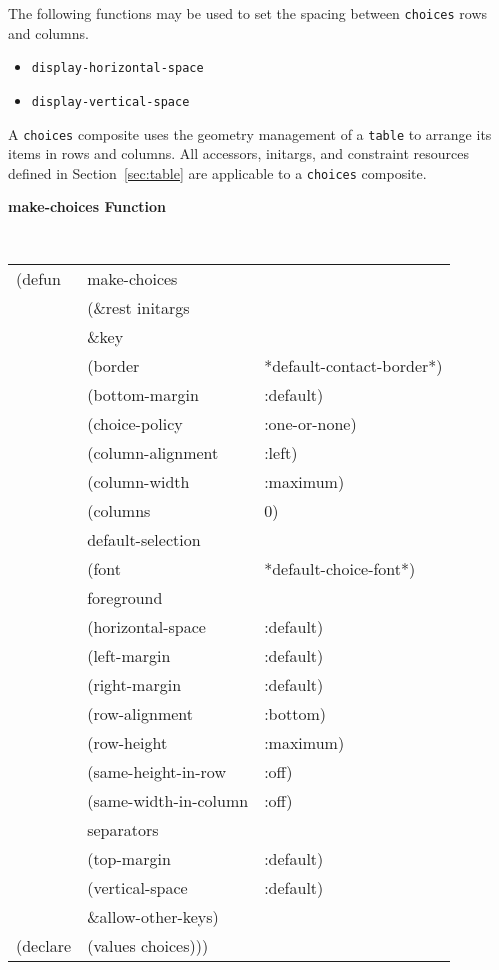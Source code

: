 \pagebreak
The following functions may be used to set the spacing between  {\tt choices} rows
and columns.

\begin{itemize}
\item {\tt display-horizontal-space}
\item {\tt display-vertical-space}
\end{itemize}




A {\tt choices} composite uses the
geometry management of a {\tt table} to arrange its items in rows and columns.
All accessors, initargs, and constraint resources defined in
Section~\ref{sec:table} are applicable to a {\tt choices} composite.


{\samepage
{\large {\bf make-choices \hfill Function}} 
\label{page:make-choices}
\begin{flushright} \parbox[t]{6.125in}{
\tt
\begin{tabular}{lll}
\raggedright
(defun & make-choices \\
       & (\&rest initargs \\
       & \&key  \\ 
       & (border                & *default-contact-border*) \\ 
       & (bottom-margin         & :default) \\
       & (choice-policy         & :one-or-none)\\
       & (column-alignment      & :left)\\
       & (column-width          & :maximum)\\
       & (columns               & 0)\\
       & default-selection & \\
       & (font                  & *default-choice-font*)\\       
       & foreground \\
       & (horizontal-space      & :default) \\
       & (left-margin           & :default) \\
       & (right-margin          & :default) \\
       & (row-alignment         & :bottom)\\
       & (row-height            & :maximum)\\
       & (same-height-in-row    & :off)\\
       & (same-width-in-column  & :off)\\
       & separators  & \\
       & (top-margin            & :default) \\
       & (vertical-space        & :default) \\
       & \&allow-other-keys) \\
(declare & (values   choices)))
\end{tabular}
\rm

}\end{flushright}}

